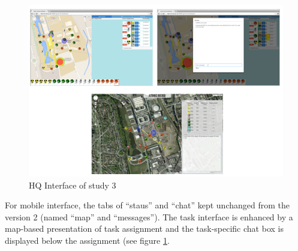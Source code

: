 \begin{figure}[H]
  \centering
  \includegraphics[width=1\textwidth]{img/conclusion/study3interfaceHQ}
  \caption{HQ Interface of study 3}
  \label{fig:study3interfacemobile}
\end{figure}

For mobile interface, the tabs of ``staus'' and ``chat'' kept unchanged from the version 2 (named ``map'' and ``messages''). The task interface is enhanced by a map-based presentation of task assignment and the task-specific chat box is displayed below the assignment (see figure \ref{fig:study3interfacemobile}.

